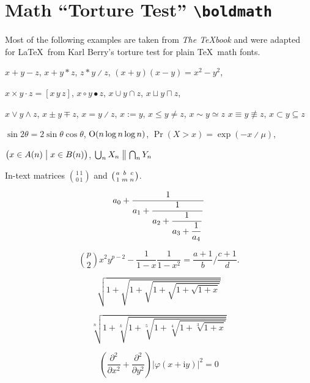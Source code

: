 	\clearpage

	\begingroup
	\bfseries\boldmath

	\section{Math \texorpdfstring{``}{“}Torture Test\texorpdfstring{''}{”} \texttt{\textbackslash boldmath}}

	Most of the following examples are taken from \textit{The \TeX book} \citep[][see \url{https://ctan.org/pkg/texbook}]{knuth:ct:a} and were adapted for \LaTeX\ from Karl Berry's torture test for plain \TeX\ math fonts.

	\noindent $x + y - z$, \quad $x + y * z$, \quad $z * y \divslash z$, \quad
	$(x+y)(x-y) = x^2 - y^2$,

	\noindent $x \times y \cdot z = [x\, y\, z]$, \quad $x\circ y \bullet z$, \quad
	$x\cup y \cap z$, \quad $x\sqcup y \sqcap z$, \quad

	\noindent $x \vee y \wedge z$, \quad $x\pm y\mp z$, \quad
	$x=y \divslash z$, \;\; $x:=y$, \;\; $x\le y \ne z$, \;\; $x \sim y \simeq z$
	$x \equiv y \nequiv z$, \;\; $x\subset y \subseteq z$

	\noindent $\sin2\theta=2\sin\theta\cos\theta$, \quad
	$\hbox{O}(n\log n\log n)$, \quad
	$\Pr(X>x)=\exp(-x \divslash \mu)$,

	\noindent $\bigl(x\in A(n)\bigm|x\in B(n)\bigr)$, \quad
	$\bigcup_n X_n\bigm\|\bigcap_n Y_n$


	\noindent In-text matrices $\binom{1\,1}{0\,1}$ and $\bigl(\genfrac{}{}{0pt}{}{a}{1}\genfrac{}{}{0pt}{}{b}{m}\genfrac{}{}{0pt}{}{c}{n}\bigr)$.


	$$a_0+\frac1{\displaystyle a_1 +
		{\strut \frac1{\displaystyle a_2 +
				{\strut \frac1{\displaystyle a_3 +
						{\strut \frac1{\displaystyle a_4}}}}}}}$$


	$$\binom{p}{2}x^2y^{p-2} - \frac1{1 - x}\frac{1}{1 - x^2}
	=
	\frac{a+1}{b}\bigg/\frac{c+1}{d}.$$


	$$\sqrt{1+\sqrt{1+\sqrt{1+\sqrt{1+\sqrt{1+x}}}}}$$

	$$\sqrt[n]{1+\sqrt[k]{1+\sqrt[5]{1+\sqrt[4]{1+\sqrt[3]{1+x}}}}}$$


	$$\left(\frac{\partial^2}{\partial x^2} + \frac{\partial^2}{\partial y^2}\right)
	\bigl|\varphi(x+\mathup{i}y)\bigr|^2=0$$

